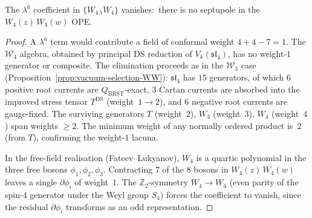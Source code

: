 \begin{proposition}
\label{prop:vacuum-selection-W4W4}
%
The $\lambda^6$ coefficient in $\{W_{4\,\lambda} W_4\}$
vanishes:\ there is no septupole in the $W_4(z)\,W_4(w)$ OPE.
\end{proposition}

\begin{proof}
A $\lambda^6$ term would contribute a field of conformal
weight $4 + 4 - 7 = 1$. The $\mathcal{W}_4$ algebra,
obtained by principal DS reduction of $V_k(\mathfrak{sl}_4)$,
has no weight-$1$ generator or composite. The elimination
proceeds as in the $\mathcal{W}_3$ case
(Proposition~\ref{prop:vacuum-selection-WW}): $\mathfrak{sl}_4$
has $15$ generators, of which
$6$ positive root currents are $Q_{\mathrm{BRST}}$-exact,
$3$ Cartan currents are absorbed into the improved stress
tensor $T^{\mathrm{DS}}$ (weight~$1 \to 2$), and
$6$ negative root currents are gauge-fixed. The surviving
generators $T$ (weight~$2$), $W_3$ (weight~$3$), $W_4$
(weight~$4$) span weights $\ge 2$. The minimum weight of
any normally ordered product is~$2$ (from $T$), confirming
the weight-$1$ lacuna.

In the free-field realisation (Fateev--Lukyanov), $W_4$ is
a quartic polynomial in the three free bosons
$\phi_1, \phi_2, \phi_3$. Contracting $7$ of the $8$
bosons in $W_4(z)\,W_4(w)$ leaves a single
$\partial\phi_i$ of weight~$1$. The
$\mathbb{Z}_2$-symmetry $W_4 \to W_4$ (even parity
of the spin-$4$ generator under the Weyl group $S_4$)
forces the coefficient to vanish, since the residual
$\partial\phi_i$ transforms as an odd representation.
\end{proof}

